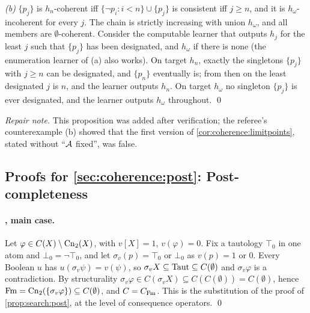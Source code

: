 \emph{(b)} $\{p_j\}$ is $h_n$-coherent iff $\{\neg p_i:i<n\}\cup\{p_j\}$ is consistent iff $j\ge n$, and it is $h_\omega$-incoherent for every $j$. The chain is strictly increasing with union $h_\omega$, and all members are $\emptyset$-coherent. Consider the computable learner that outputs $h_j$ for the least $j$ such that $\{p_j\}$ has been designated, and $h_\omega$ if there is none (the enumeration learner of (a) also works). On target $h_n$, exactly the singletons $\{p_j\}$ with $j\ge n$ can be designated, and $\{p_n\}$ eventually is; from then on the least designated $j$ is $n$, and the learner outputs $h_n$. On target $h_\omega$ no singleton $\{p_j\}$ is ever designated, and the learner outputs $h_\omega$ throughout. \qed

\emph{Repair note.} This proposition was added after verification; the referee's counterexample (b) showed that the first version of \cref{cor:coherence:limitpoints}, stated without ``$\mathcal{A}$ fixed'', was false.

\subsection{Proofs for \texorpdfstring{\cref{sec:coherence:post}}{Section 6.2}: Post-completeness}\label{app:coherence:post}

\paragraph{, main case.} Let $\varphi\in C(X)\setminus\mathrm{Cn}_2(X)$, with $v[X]=1$, $v(\varphi)=0$. Fix a tautology $\top_0$ in one atom and $\bot_0=\neg\top_0$, and let $\sigma_v(p)=\top_0$ or $\bot_0$ as $v(p)=1$ or $0$. Every Boolean $u$ has $u(\sigma_v\psi)=v(\psi)$, so $\sigma_vX\subseteq\mathrm{Taut}\subseteq C(\emptyset)$ and $\sigma_v\varphi$ is a contradiction. By structurality $\sigma_v\varphi\in C(\sigma_vX)\subseteq C(C(\emptyset))=C(\emptyset)$, hence $\mathrm{Fm}=\mathrm{Cn}_2(\{\sigma_v\varphi\})\subseteq C(\emptyset)$, and $C=C_{\mathrm{Fm}}$. This is the substitution of the proof of \cref{prop:search:post}, at the level of consequence operators. \qed

